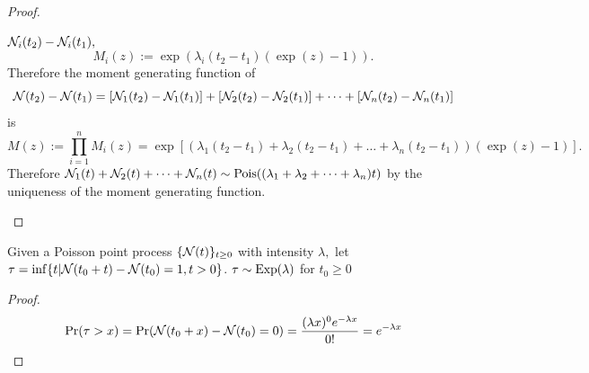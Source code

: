 \begin{proof}
\begin{enumerate}
              $\mathcal{N}_i(t_2) - \mathcal{N}_i(t_1),$
              $$M_i(z) := \exp(\lambda_i(t_2 - t_1)(\exp(z) - 1)).$$
              Therefore the moment generating function of
              $$\mathcal{N}(t_2) - \mathcal{N}(t_1) =
                  [\mathcal{N}_1(t_2) - \mathcal{N}_1(t_1)] + [\mathcal{N}_2(t_2) - \mathcal{N}_2(t_1)] + \dots
                  + [\mathcal{N}_n(t_2) - \mathcal{N}_n(t_1)]$$ is
              $$ M(z) := \prod_{i = 1}^n M_i(z) =
                  \exp[
                      (\lambda_1 (t_2 - t_1) + \lambda_2 (t_2 - t_1) + \dots
                      + \lambda_n (t_2 - t_1))
                      (\exp(z) - 1)
                  ].$$
              Therefore
              $\mathcal{N}_1(t) + \mathcal{N}_2(t) + \dots + \mathcal{N}_n(t) \sim
                  \operatorname{Pois}((\lambda_1 + \lambda_2 + \dots + \lambda_n) t)$
              by the uniqueness of the moment generating function.
    \end{enumerate}
\end{proof}

\begin{theorem}
    \label{thm:next_pp_event}
    Given a Poisson point process $\{\mathcal{N}(t)\}_{t\geq 0}$ with intensity
    $\lambda,$ let $\tau = \inf\{t | \mathcal{N}(t_0 + t) - \mathcal{N}(t_0) = 1, t > 0\}$.
    $\tau \sim \operatorname{Exp}(\lambda)$ for $t_0 \geq 0$
\end{theorem}

\begin{proof}
    $$\Pr(\tau > x) = \Pr(\mathcal{N}(t_0 + x) - \mathcal{N}(t_0) = 0)
        = \frac{(\lambda x)^0e^{-\lambda x}}{0!} = e^{-\lambda x}$$
\end{proof}

